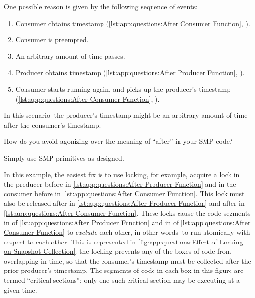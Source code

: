 \begin{fcvref}
One possible reason is given by the following sequence of events:
\begin{enumerate}
\item	Consumer obtains timestamp
	(\cref{lst:app:questions:After Consumer Function},
	).
\item	Consumer is preempted.
\item	An arbitrary amount of time passes.
\item	Producer obtains timestamp
	(\cref{lst:app:questions:After Producer Function},
	).
\item	Consumer starts running again, and picks up the producer's
	timestamp
	(\cref{lst:app:questions:After Consumer Function},
	).
\end{enumerate}

In this scenario, the producer's timestamp might be an arbitrary
amount of time after the consumer's timestamp.

How do you avoid agonizing over the meaning of ``after'' in your
SMP code?

Simply use SMP primitives as designed.

In this example, the easiest fix is to use locking, for example,
acquire a lock in the producer before  in
\cref{lst:app:questions:After Producer Function} and in
the consumer before  in
\cref{lst:app:questions:After Consumer Function}.
This lock must also be released after  in
\cref{lst:app:questions:After Producer Function} and
after  in
\cref{lst:app:questions:After Consumer Function}.
These locks cause the code segments in
 of
\cref{lst:app:questions:After Producer Function} and in
 of
\cref{lst:app:questions:After Consumer Function} to {\em exclude}
each other, in other words, to run atomically with respect to each other.
This is represented in
\cref{fig:app:questions:Effect of Locking on Snapshot Collection}:
the locking prevents any of the boxes of code from overlapping in time, so
that the consumer's timestamp must be collected after the prior
producer's timestamp.
The segments of code in each box in this figure are termed
``critical sections''; only one such critical section may be executing
at a given time.
\end{fcvref}

